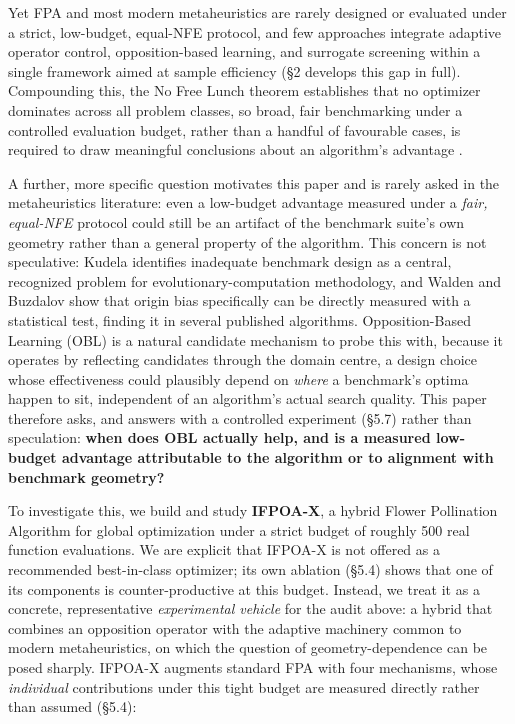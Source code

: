\documentclass[preprint,12pt]{elsarticle}
\begin{document}
Yet FPA and most modern metaheuristics are rarely designed or evaluated under a strict, low-budget, equal-NFE protocol, and few approaches integrate adaptive operator control, opposition-based learning, and surrogate screening within a single framework aimed at sample efficiency (\S2 develops this gap in full). Compounding this, the No Free Lunch theorem \cite{wolpert1997no} establishes that no optimizer dominates across all problem classes, so broad, fair benchmarking under a controlled evaluation budget, rather than a handful of favourable cases, is required to draw meaningful conclusions about an algorithm's advantage \cite{sorensen2015metaheuristics}.

A further, more specific question motivates this paper and is rarely asked in the metaheuristics literature: even a low-budget advantage measured under a \emph{fair, equal-NFE} protocol could still be an artifact of the benchmark suite's own geometry rather than a general property of the algorithm. This concern is not speculative: Kudela \cite{kudela2022critical} identifies inadequate benchmark design as a central, recognized problem for evolutionary-computation methodology, and Walden and Buzdalov \cite{walden2024simple} show that origin bias specifically can be directly measured with a statistical test, finding it in several published algorithms. Opposition-Based Learning (OBL) is a natural candidate mechanism to probe this with, because it operates by reflecting candidates through the domain centre, a design choice whose effectiveness could plausibly depend on \emph{where} a benchmark's optima happen to sit, independent of an algorithm's actual search quality. This paper therefore asks, and answers with a controlled experiment (\S5.7) rather than speculation: \textbf{when does OBL actually help, and is a measured low-budget advantage attributable to the algorithm or to alignment with benchmark geometry?}

To investigate this, we build and study \textbf{IFPOA-X}, a hybrid Flower Pollination Algorithm for global optimization under a strict budget of roughly 500 real function evaluations. We are explicit that IFPOA-X is not offered as a recommended best-in-class optimizer; its own ablation (\S5.4) shows that one of its components is counter-productive at this budget. Instead, we treat it as a concrete, representative \emph{experimental vehicle} for the audit above: a hybrid that combines an opposition operator with the adaptive machinery common to modern metaheuristics, on which the question of geometry-dependence can be posed sharply. IFPOA-X augments standard FPA with four mechanisms, whose \emph{individual} contributions under this tight budget are measured directly rather than assumed (\S5.4):
\end{document}
